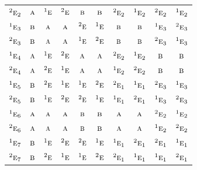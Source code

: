 \documentclass[10pt,a4paper]{article}
\numberwithin{equation}{section}
\newcommand{\irr}[1]{\text{\normalfont\scshape #1}}
\newcommand{\conjpair}[1]{{}^{#1}}
\begin{document}
{\begin{longtable}{@{}lccccccccc@{}}
$\conjpair{2}\irr{e}_{2}$ & $\irr{a}$ & $\conjpair{1}\irr{e}$ & $\conjpair{2}\irr{e}$ & $\irr{b}$ & $\irr{b}$ & $\conjpair{2}\irr{e}_{2}$ & $\conjpair{1}\irr{e}_{2}$ & $\conjpair{2}\irr{e}_{2}$ & $\conjpair{1}\irr{e}_{2}$\\
$\conjpair{1}\irr{e}_{3}$ & $\irr{b}$ & $\irr{a}$ & $\irr{a}$ & $\conjpair{2}\irr{e}$ & $\conjpair{1}\irr{e}$ & $\irr{b}$ & $\irr{b}$ & $\conjpair{1}\irr{e}_{3}$ & $\conjpair{2}\irr{e}_{3}$\\
$\conjpair{2}\irr{e}_{3}$ & $\irr{b}$ & $\irr{a}$ & $\irr{a}$ & $\conjpair{1}\irr{e}$ & $\conjpair{2}\irr{e}$ & $\irr{b}$ & $\irr{b}$ & $\conjpair{2}\irr{e}_{3}$ & $\conjpair{1}\irr{e}_{3}$\\
$\conjpair{1}\irr{e}_{4}$ & $\irr{a}$ & $\conjpair{1}\irr{e}$ & $\conjpair{2}\irr{e}$ & $\irr{a}$ & $\irr{a}$ & $\conjpair{2}\irr{e}_{2}$ & $\conjpair{1}\irr{e}_{2}$ & $\irr{b}$ & $\irr{b}$\\
$\conjpair{2}\irr{e}_{4}$ & $\irr{a}$ & $\conjpair{2}\irr{e}$ & $\conjpair{1}\irr{e}$ & $\irr{a}$ & $\irr{a}$ & $\conjpair{1}\irr{e}_{2}$ & $\conjpair{2}\irr{e}_{2}$ & $\irr{b}$ & $\irr{b}$\\
$\conjpair{1}\irr{e}_{5}$ & $\irr{b}$ & $\conjpair{2}\irr{e}$ & $\conjpair{1}\irr{e}$ & $\conjpair{1}\irr{e}$ & $\conjpair{2}\irr{e}$ & $\conjpair{2}\irr{e}_{1}$ & $\conjpair{1}\irr{e}_{1}$ & $\conjpair{2}\irr{e}_{3}$ & $\conjpair{1}\irr{e}_{3}$\\
$\conjpair{2}\irr{e}_{5}$ & $\irr{b}$ & $\conjpair{1}\irr{e}$ & $\conjpair{2}\irr{e}$ & $\conjpair{2}\irr{e}$ & $\conjpair{1}\irr{e}$ & $\conjpair{1}\irr{e}_{1}$ & $\conjpair{2}\irr{e}_{1}$ & $\conjpair{1}\irr{e}_{3}$ & $\conjpair{2}\irr{e}_{3}$\\
$\conjpair{1}\irr{e}_{6}$ & $\irr{a}$ & $\irr{a}$ & $\irr{a}$ & $\irr{b}$ & $\irr{b}$ & $\irr{a}$ & $\irr{a}$ & $\conjpair{2}\irr{e}_{2}$ & $\conjpair{1}\irr{e}_{2}$\\
$\conjpair{2}\irr{e}_{6}$ & $\irr{a}$ & $\irr{a}$ & $\irr{a}$ & $\irr{b}$ & $\irr{b}$ & $\irr{a}$ & $\irr{a}$ & $\conjpair{1}\irr{e}_{2}$ & $\conjpair{2}\irr{e}_{2}$\\
$\conjpair{1}\irr{e}_{7}$ & $\irr{b}$ & $\conjpair{1}\irr{e}$ & $\conjpair{2}\irr{e}$ & $\conjpair{2}\irr{e}$ & $\conjpair{1}\irr{e}$ & $\conjpair{1}\irr{e}_{1}$ & $\conjpair{2}\irr{e}_{1}$ & $\conjpair{2}\irr{e}_{1}$ & $\conjpair{1}\irr{e}_{1}$\\
$\conjpair{2}\irr{e}_{7}$ & $\irr{b}$ & $\conjpair{2}\irr{e}$ & $\conjpair{1}\irr{e}$ & $\conjpair{1}\irr{e}$ & $\conjpair{2}\irr{e}$ & $\conjpair{2}\irr{e}_{1}$ & $\conjpair{1}\irr{e}_{1}$ & $\conjpair{1}\irr{e}_{1}$ & $\conjpair{2}\irr{e}_{1}$\\

\end{longtable}}
\end{document}
